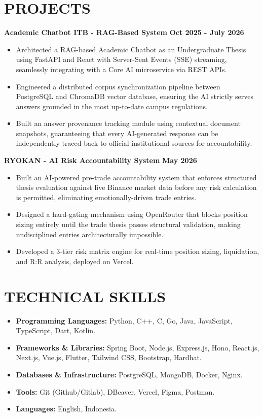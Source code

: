 \documentclass[10pt, a4paper]{article}
\begin{document}
\section*{PROJECTS}
\noindent
\textbf{Academic Chatbot ITB - RAG-Based System} \hfill \textbf{Oct 2025 - July 2026}
\begin{itemize}[leftmargin=0.25in, topsep=2pt, itemsep=0pt, parsep=2pt]
    \item Architected a RAG-based Academic Chatbot as an Undergraduate Thesis using FastAPI and React with Server-Sent Events (SSE) streaming, seamlessly integrating with a Core AI microservice via REST APIs.
    \item Engineered a distributed corpus synchronization pipeline between PostgreSQL and ChromaDB vector database, ensuring the AI strictly serves answers grounded in the most up-to-date campus regulations.
    \item Built an answer provenance tracking module using contextual document snapshots, guaranteeing that every AI-generated response can be independently traced back to official institutional sources for accountability.
\end{itemize}

\vspace{4pt}
\noindent
\textbf{RYOKAN - AI Risk Accountability System} \hfill \textbf{May 2026}
\begin{itemize}[leftmargin=0.25in, topsep=2pt, itemsep=0pt, parsep=2pt]
    \item Built an AI-powered pre-trade accountability system that enforces structured thesis evaluation against live Binance market data before any risk calculation is permitted, eliminating emotionally-driven trade entries.
    \item Designed a hard-gating mechanism using OpenRouter that blocks position sizing entirely until the trade thesis passes structural validation, making undisciplined entries architecturally impossible.
    \item Developed a 3-tier risk matrix engine for real-time position sizing, liquidation, and R:R analysis, deployed on Vercel.
\end{itemize}

\section*{TECHNICAL SKILLS}
\begin{itemize}[leftmargin=0.25in, topsep=2pt, itemsep=0pt, parsep=2pt]
    \item \textbf{Programming Languages:} Python, C++, C, Go, Java, JavaScript, TypeScript, Dart, Kotlin.
    \item \textbf{Frameworks \& Libraries:} Spring Boot, Node.js, Express.js, Hono, React.js, Next.js, Vue.js, Flutter, Tailwind CSS, Bootstrap, Hardhat.
    \item \textbf{Databases \& Infrastructure:} PostgreSQL, MongoDB, Docker, Nginx.
    \item \textbf{Tools:} Git (Github/Gitlab), DBeaver, Vercel, Figma, Postman.
    \item \textbf{Languages:} English, Indonesia.
\end{itemize}
\end{document}

